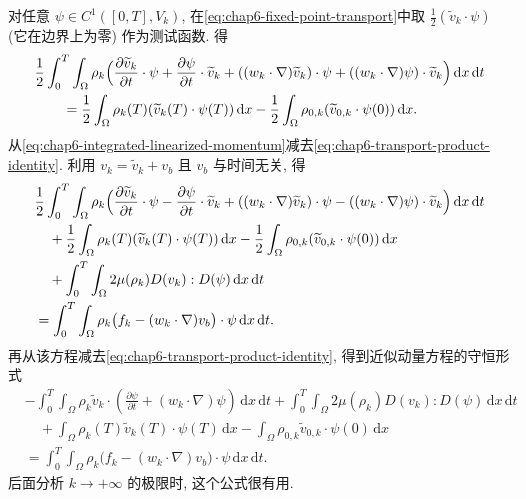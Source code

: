 \begin{sloppypar}
\begin{itemize}
 对任意 $\psi\in C^1([0,T],V_k)$, 在\eqref{eq:chap6-fixed-point-transport}中取 $\tfrac12(\widetilde v_k\cdot\psi)$ (它在边界上为零) 作为测试函数. 得
 \begin{equation}
 \begin{aligned}
 &\frac12\int_0^T\int_\Omega\rho_k\Bigl(
 \frac{\partial\widetilde v_k}{\partial t}\cdot\psi
 +\frac{\partial\psi}{\partial t}\cdot\widetilde v_k
 +((w_k\cdot\nabla)\widetilde v_k)\cdot\psi
 +((w_k\cdot\nabla)\psi)\cdot\widetilde v_k\Bigr)\,\mathrm dx\,\mathrm dt\\
 &\qquad=\frac12\int_\Omega\rho_k(T)(\widetilde v_k(T)\cdot\psi(T))\,\mathrm dx
 -\frac12\int_\Omega\rho_{0,k}(\widetilde v_{0,k}\cdot\psi(0))\,\mathrm dx.
 \end{aligned}
 \label{eq:chap6-transport-product-identity}
 \end{equation}
 从\eqref{eq:chap6-integrated-linearized-momentum}减去\eqref{eq:chap6-transport-product-identity}. 利用 $v_k=\widetilde v_k+v_b$ 且 $v_b$ 与时间无关, 得
 \begin{equation}
 \begin{aligned}
 &\frac12\int_0^T\int_\Omega\rho_k\Bigl(
 \frac{\partial\widetilde v_k}{\partial t}\cdot\psi
 -\frac{\partial\psi}{\partial t}\cdot\widetilde v_k
 +((w_k\cdot\nabla)\widetilde v_k)\cdot\psi
 -((w_k\cdot\nabla)\psi)\cdot\widetilde v_k\Bigr)\,\mathrm dx\,\mathrm dt\\
 &\quad+\frac12\int_\Omega\rho_k(T)(\widetilde v_k(T)\cdot\psi(T))\,\mathrm dx
 -\frac12\int_\Omega\rho_{0,k}(\widetilde v_{0,k}\cdot\psi(0))\,\mathrm dx\\
 &\quad+\int_0^T\int_\Omega2\mu(\rho_k)D(v_k):D(\psi)\,\mathrm dx\,\mathrm dt\\
 &=\int_0^T\int_\Omega\rho_k\bigl(f_k-(w_k\cdot\nabla)v_b\bigr)\cdot\psi\,\mathrm dx\,\mathrm dt.
 \end{aligned}
 \label{eq:chap6-skew-linearized-momentum}
 \end{equation}
 再从该方程减去\eqref{eq:chap6-transport-product-identity}, 得到近似动量方程的守恒形式
 \begin{equation}
 \begin{aligned}
 &-\int_0^T\int_\Omega\rho_k\widetilde v_k\cdot
 \left(\frac{\partial\psi}{\partial t}+(w_k\cdot\nabla)\psi\right)
 \,\mathrm dx\,\mathrm dt
 +\int_0^T\int_\Omega2\mu(\rho_k)D(v_k):D(\psi)\,\mathrm dx\,\mathrm dt\\
 &\quad+\int_\Omega\rho_k(T)\widetilde v_k(T)\cdot\psi(T)\,\mathrm dx
 -\int_\Omega\rho_{0,k}\widetilde v_{0,k}\cdot\psi(0)\,\mathrm dx\\
 &=\int_0^T\int_\Omega\rho_k\bigl(f_k-(w_k\cdot\nabla)v_b\bigr)\cdot\psi
 \,\mathrm dx\,\mathrm dt.
 \end{aligned}
 \label{eq:chap6-conservative-approximate-momentum}
 \end{equation}
 后面分析 $k\to+\infty$ 的极限时, 这个公式很有用.


\end{itemize}
\end{sloppypar}
